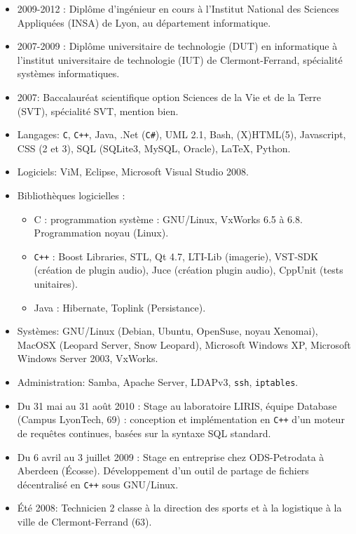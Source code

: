 \begin{itemize}
    \item 2009-2012 : Diplôme d'ingénieur en cours à l'Institut National des Sciences Appliquées (INSA) de Lyon, au département informatique.
    \item 2007-2009 : Diplôme universitaire de technologie (DUT) en informatique à l'institut universitaire de technologie (IUT) de Clermont-Ferrand, spécialité systèmes informatiques.
    \item 2007: Baccalauréat scientifique option Sciences de la Vie et de la
    Terre (SVT), spécialité SVT, mention bien.
\end{itemize}
\begin{itemize}
    \item Langages: {\tt C}, {\tt C++}, Java, .Net ({\tt C\#}), UML 2.1, Bash,
    (X)HTML(5), Javascript, CSS (2 et 3), SQL (SQLite3, MySQL, Oracle),
    \LaTeX{}, Python.
    \item Logiciels: ViM, Eclipse, Microsoft Visual Studio 2008.
    \item Bibliothèques logicielles :
    \begin{itemize}
	\item {C} : programmation système : GNU/Linux, VxWorks 6.5 à 6.8. Programmation noyau (Linux).
	\item {\tt C++} : Boost Libraries, STL, Qt 4.7, LTI-Lib (imagerie),
	VST-SDK (création de plugin audio), Juce (création plugin audio),
	CppUnit (tests unitaires).
	\item Java : Hibernate, Toplink (Persistance).
    \end{itemize}
    \item Systèmes: GNU/Linux (Debian, Ubuntu, OpenSuse, noyau Xenomai), MacOSX
    (Leopard Server, Snow Leopard), Microsoft Windows XP, Microsoft Windows Server 2003, VxWorks.
	\item Administration: Samba, Apache Server, LDAPv3, {\tt ssh}, {\tt iptables}.
\end{itemize}
\begin{itemize}
       \item Du 31 mai au 31 août 2010 : Stage au laboratoire LIRIS, équipe
       Database (Campus LyonTech, 69) : conception et implémentation en
				      \texttt{C++} d'un moteur de requêtes
				      continues, basées sur la syntaxe SQL
				      standard.
       \item Du 6 avril au 3 juillet 2009 : Stage en entreprise chez
       ODS-Petrodata à Aberdeen (Écosse). Développement d'un outil de partage de
       fichiers décentralisé en {\tt C++} sous GNU/Linux.
       \item Été 2008: Technicien 2\ieme{} classe à la direction des sports et à la logistique à la ville de Clermont-Ferrand (63).
\end{itemize}
